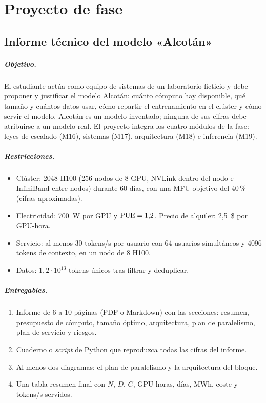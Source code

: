 \chapter{Proyecto de fase}
\label{cap:proyecto}

\section*{Informe técnico del modelo «Alcotán»}

\paragraph{Objetivo.} El estudiante actúa como equipo de sistemas de un laboratorio ficticio y debe proponer y justificar el modelo Alcotán: cuánto cómputo hay disponible, qué tamaño y cuántos datos usar, cómo repartir el entrenamiento en el clúster y cómo servir el modelo. Alcotán es un modelo inventado; ninguna de sus cifras debe atribuirse a un modelo real. El proyecto integra los cuatro módulos de la fase: leyes de escalado (M16), sistemas (M17), arquitectura (M18) e inferencia (M19).

\paragraph{Restricciones.}
\begin{itemize}[label=\textendash]
  \item Clúster: 2048 H100 (256 nodos de 8 GPU, NVLink dentro del nodo e InfiniBand entre nodos) durante 60 días, con una MFU objetivo del 40\,\% (cifras aproximadas).
  \item Electricidad: 700~W por GPU y $\mathrm{PUE}=1{,}2$. Precio de alquiler: 2{,}5~\$ por GPU-hora.
  \item Servicio: al menos 30 tokens/s por usuario con 64 usuarios simultáneos y 4096 tokens de contexto, en un nodo de 8 H100.
  \item Datos: $1{,}2\cdot 10^{13}$ tokens únicos tras filtrar y deduplicar.
\end{itemize}

\paragraph{Entregables.}
\begin{enumerate}[label=\arabic*.]
  \item Informe de 6 a 10 páginas (PDF o Markdown) con las secciones: resumen, presupuesto de cómputo, tamaño óptimo, arquitectura, plan de paralelismo, plan de servicio y riesgos.
  \item Cuaderno o \emph{script} de Python que reproduzca todas las cifras del informe.
  \item Al menos dos diagramas: el plan de paralelismo y la arquitectura del bloque.
  \item Una tabla resumen final con $N$, $D$, $C$, GPU-horas, días, MWh, coste y tokens/s servidos.
\end{enumerate}

